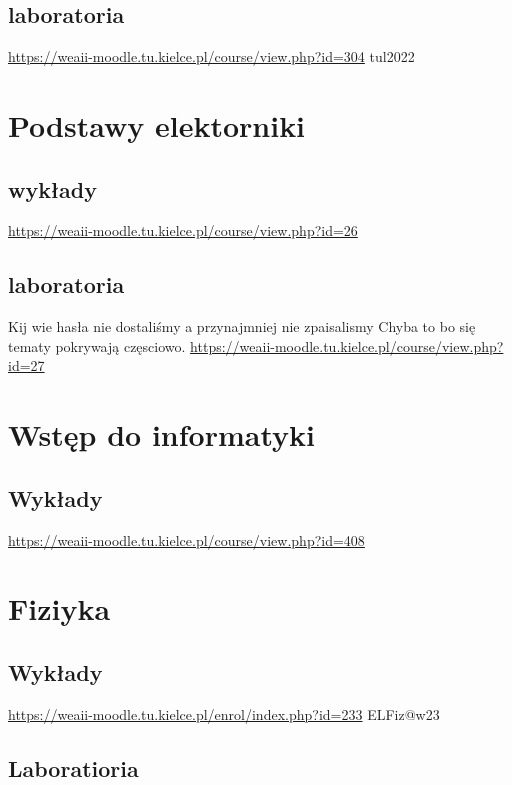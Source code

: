 \documentclass[11pt]{article}
\begin{document}
\subsection{laboratoria}
\label{sec:org1ec61b8}
\url{https://weaii-moodle.tu.kielce.pl/course/view.php?id=304} tul2022
\section{Podstawy elektorniki}
\label{sec:orgf18d7bd}
\subsection{wykłady}
\label{sec:orgdabd017}
\url{https://weaii-moodle.tu.kielce.pl/course/view.php?id=26}
\subsection{laboratoria}
\label{sec:orgeeebb5c}
Kij wie hasła nie dostaliśmy a przynajmniej nie zpaisalismy
Chyba to bo się tematy pokrywają częsciowo.
\url{https://weaii-moodle.tu.kielce.pl/course/view.php?id=27}
\section{Wstęp do informatyki}
\label{sec:orgb4f3b47}
\subsection{Wykłady}
\label{sec:org782bd0f}
\url{https://weaii-moodle.tu.kielce.pl/course/view.php?id=408}
\section{Fiziyka}
\label{sec:orgb64b5ad}
\subsection{Wykłady}
\label{sec:org68e0b3b}
\url{https://weaii-moodle.tu.kielce.pl/enrol/index.php?id=233} ELFiz@w23
\subsection{Laboratioria}
\label{sec:orgfe08d1f}
\end{document}
